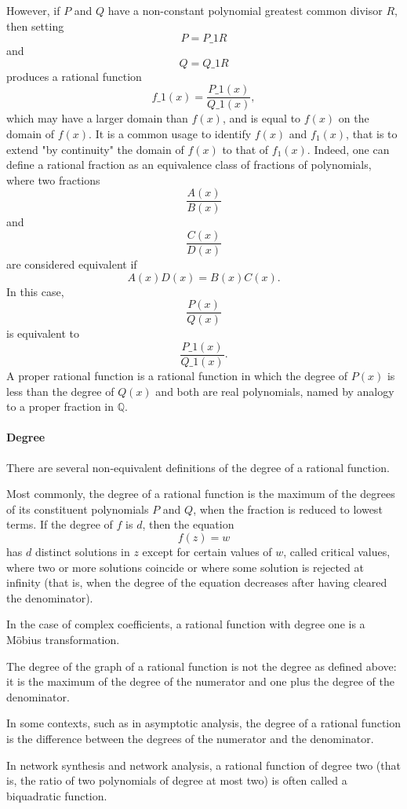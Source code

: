 However, if $P$ and $Q$ have a non-constant polynomial greatest common divisor $R$, then setting 
$$
P = P\_{1}R
$$
and 
$$
Q = Q\_{1}R
$$
produces a rational function
$$
f\_{1}(x) = \frac{P\_{1}(x)}{Q\_{1}(x)},
$$
which may have a larger domain than $f(x)$, and is equal to $f(x)$ on the domain of $f(x)$. It is a common usage to identify $f(x)$ and $f_{1}(x)$, that is to extend "by continuity" the domain of $f(x)$ to that of $f_{1}(x)$. Indeed, one can define a rational fraction as an equivalence class of fractions of polynomials, where two fractions
$$
\frac{A(x)}{B(x)}
$$
and
$$
\frac{C(x)}{D(x)}
$$
are considered equivalent if
$$
A(x)D(x) = B(x)C(x).
$$
In this case, 
$$
\frac{P(x)}{Q(x)}
$$
is equivalent to
$$
\frac{P\_{1}(x)}{Q\_{1}(x)}.
$$
A proper rational function is a rational function in which the degree of $P(x)$ is less than the degree of $Q(x)$ and both are real polynomials, named by analogy to a proper fraction in $\mathbb{Q}$.

\paragraph{Degree}

There are several non-equivalent definitions of the degree of a rational function.

Most commonly, the degree of a rational function is the maximum of the degrees of its constituent polynomials $P$ and $Q$, when the fraction is reduced to lowest terms. If the degree of $f$ is $d$, then the equation
$$
f(z) = w
$$
has $d$ distinct solutions in $z$ except for certain values of $w$, called critical values, where two or more solutions coincide or where some solution is rejected at infinity (that is, when the degree of the equation decreases after having cleared the denominator).

In the case of complex coefficients, a rational function with degree one is a Möbius transformation.

The degree of the graph of a rational function is not the degree as defined above: it is the maximum of the degree of the numerator and one plus the degree of the denominator.

In some contexts, such as in asymptotic analysis, the degree of a rational function is the difference between the degrees of the numerator and the denominator.

In network synthesis and network analysis, a rational function of degree two (that is, the ratio of two polynomials of degree at most two) is often called a biquadratic function.


